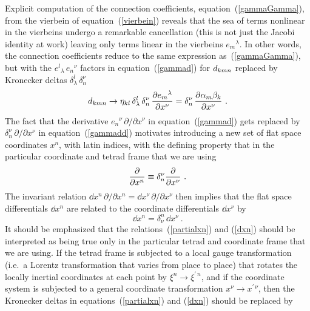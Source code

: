 \documentclass[twocolumn,showpacs,preprintnumbers,amsmath,amssymb,prb]{revtex4}
\begin{document}
Explicit computation of the connection coefficients,
equation~(\ref{gammaGamma}),
from the vierbein of equation~(\ref{vierbein})
reveals that
the sea of terms nonlinear in the vierbeins
undergo a remarkable cancellation
(this is not just the Jacobi identity at work)
leaving only terms linear in the vierbeins ${e_m}^\lambda$.
In other words,
the connection coefficients reduce to
the same expression as~(\ref{gammaGamma}), but with the
${e^l}_\lambda \, {e_n}^\nu$
factors
in equation~(\ref{gammad}) for $d_{kmn}$
replaced by Kronecker deltas
$\delta^l_\lambda \, \delta_n^\nu$
\begin{equation}
\label{gammadd}
  d_{kmn}
  \rightarrow
  \eta_{kl} \, \delta^l_\lambda \, \delta_n^\nu \,
  {\partial {e_m}^\lambda \over \partial x^\nu}
  =
  \delta_n^\nu \, {\partial \alpha_m \beta_k \over \partial x^\nu}
  \ .
\end{equation}
The fact that the derivative
${e_n}^\nu \, \partial / \partial x^\nu$ in equation~(\ref{gammad})
gets replaced by $\delta_n^\nu \, \partial / \partial x^\nu$
in equation~(\ref{gammadd})
motivates introducing a new set of flat space coordinates $x^n$,
with latin indices,
with the defining property
that in the particular coordinate and tetrad frame that we are using
\begin{equation}
\label{partialxn}
  {\partial \over \partial x^n} \equiv
  \delta_n^\nu {\partial \over \partial x^\nu}
  \ .
\end{equation}
The invariant relation
$\dd x^n \, \partial / \partial x^n = \dd x^\nu \, \partial / \partial x^\nu$
then implies that the flat space differentials $\dd x^n$
are related to the coordinate differentials $\dd x^\nu$ by
\begin{equation}
\label{dxn}
  \dd x^n = \delta_\nu^n \, \dd x^\nu
  \ .
\end{equation}
It should be emphasized that the relations~(\ref{partialxn}) and (\ref{dxn})
should be interpreted as being true only in the particular tetrad
and coordinate frame that we are using.
If the tetrad frame is subjected to a local gauge transformation
(i.e.\ a Lorentz transformation that varies from place to place)
that rotates the locally inertial coordinates at each point by
$\xi^n \rightarrow \xi^{\prime \, n}$,
and if the coordinate system is subjected to a general coordinate transformation
$x^\nu \rightarrow x^{\prime \, \nu}$,
then the Kronecker deltas in equations~(\ref{partialxn}) and (\ref{dxn})
should be replaced by
\end{document}

